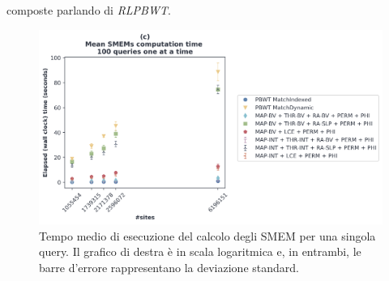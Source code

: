 composte parlando di \textit{RLPBWT}.
\begin{figure}
  \centering
  \includegraphics[width=\textwidth]{img/exe_time_single_paper.png}
  \caption{Tempo medio di esecuzione del calcolo degli SMEM per una singola
    query. Il grafico di destra è in scala logaritmica e, in entrambi, le
    barre d'errore rappresentano la deviazione standard.}
  \label{fig:smemsinglechr}
\end{figure}
